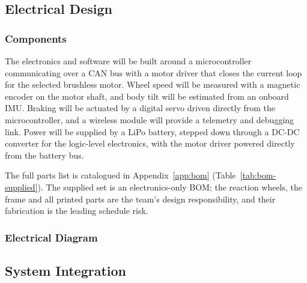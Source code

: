 \subsection{Electrical Design}
\label{sec:electrical}

\subsubsection{Components}

The electronics and software will be built around a microcontroller communicating over a CAN bus with a motor driver that closes the current loop for the selected brushless motor. Wheel speed will be measured with a magnetic encoder on the motor shaft, and body tilt will be estimated from an onboard IMU. Braking will be actuated by a digital servo driven directly from the microcontroller, and a wireless module will provide a telemetry and debugging link. Power will be supplied by a LiPo battery, stepped down through a DC-DC converter for the logic-level electronics, with the motor driver powered directly from the battery bus.

The full parts list is catalogued in Appendix~\ref{app:bom}
(Table~\ref{tab:bom-supplied}). The supplied set is an electronics-only BOM;
the reaction wheels, the frame and all printed parts are the team's design
responsibility, and their fabrication is the leading schedule risk.

\subsubsection{Electrical Diagram}


\subsection{System Integration}
\label{sec:integration}

